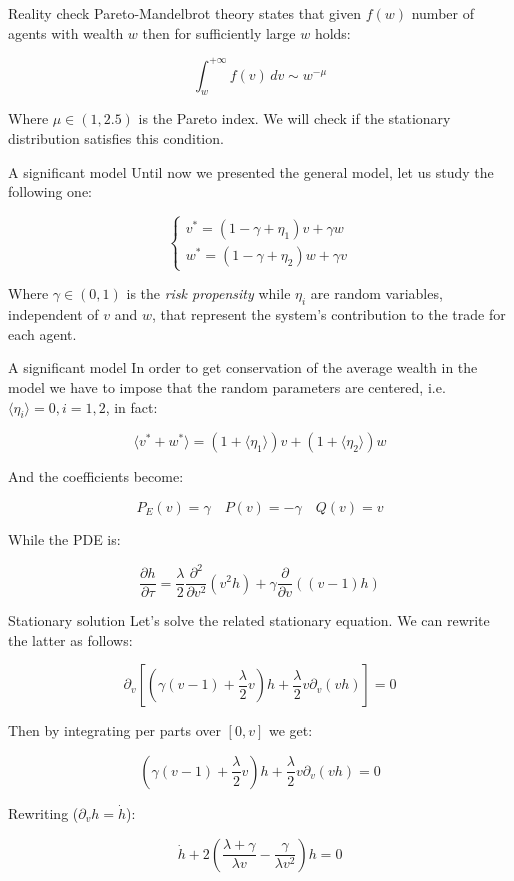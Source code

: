 \documentclass[10pt, compress]{beamer}
\begin{document}
\begin{frame}{Reality check}
    Pareto-Mandelbrot theory states that given $f(w)$ number of agents with wealth $w$ then for sufficiently large $w$ holds:
    
    \hspace{5mm}
    
    \[\int_w^{+\infty}f(v) \,dv \sim w^{-\mu}\]

\hspace{5mm}

    Where $\mu\in(1,2.5)$ is the Pareto index. We will check if the stationary distribution satisfies this condition.
\end{frame}

\begin{frame}{A significant model}
    Until now we presented the general model, let us study the following one:

\begin{equation*}\label{Model}
\begin{cases}
v^{*}=\left(1-\gamma+\eta_1\right)v+\gamma w \\
w^{*}=\left(1-\gamma+\eta_2\right)w+\gamma v
\end{cases}
\end{equation*}

Where $\gamma\in(0,1)$ is the \textit{risk propensity} while $\eta_i$ are random variables, independent of $v$ and $w$, that represent the system's contribution to the trade for each agent.

\end{frame}

\begin{frame}{A significant model}
    In order to get conservation of the average wealth in the model we have to impose that the random parameters are centered, i.e. $\langle\eta_i\rangle=0, i=1,2$, in fact:
    
    \[\langle v^{*}+w^{*}\rangle=(1+\langle\eta_1\rangle)v +(1+\langle\eta_2\rangle)w\]
    
    And the coefficients become:

\[P_E(v) = \gamma \quad P(v) = -\gamma \quad Q(v) = v\]

While the PDE is:

\[\frac{\partial h}{\partial\tau}=\frac{\lambda}{2}\frac{\partial^2}{\partial v^2}(v^2h)+\gamma\frac{\partial}{\partial v}((v-1)h)\]
\end{frame}


\begin{frame}{Stationary solution}
    Let's solve the related stationary equation. We can rewrite the latter as follows:

\[\partial_v\left[\left(\gamma(v-1)+\frac{\lambda}{2}v\right)h+\frac{\lambda}{2}v\partial_v(vh)\right]=0\]

Then by integrating per parts over $[0,v]$ we get:

\[\left(\gamma(v-1)+\frac{\lambda}{2}v\right)h+\frac{\lambda}{2}v\partial_v(vh)=0\]

Rewriting ($\partial_vh=\dot{h}$):

\[\dot{h}+2\left(\frac{\lambda+\gamma}{\lambda v}-\frac{\gamma}{\lambda v^2}\right)h=0\]
\end{frame}
\end{document}
